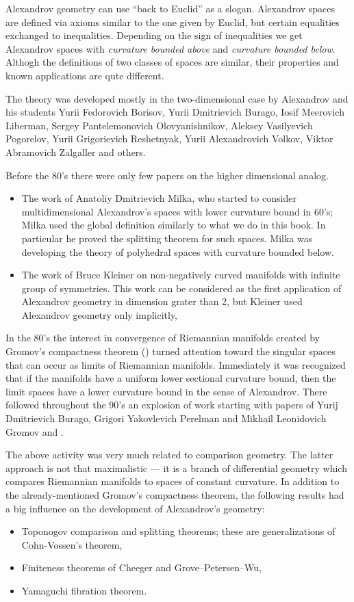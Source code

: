 Alexandrov geometry can use ``back to Euclid'' as a slogan.
Alexandrov spaces are defined via axioms similar to the one given by Euclid,
but certain  equalities exchanged to inequalities. 
Depending on the sign of inequalities we get Alexandrov spaces with \emph{curvature bounded above} and \emph{curvature bounded below}.
Althogh the definitions of two classes of spaces are similar, their properties and known applications are qute different.

The theory was developed mostly in the two-dimensional case 
by Alexandrov
and his students  
Yurii Fedorovich Borisov,
Yurii Dmitrievich Burago,
Iosif Meerovich Liberman,
Sergey Pantelemonovich Olovyanishnikov,
Aleksey Vasilyevich Pogorelov,
Yurii Grigorievich Reshetnyak,
Yurii Alexandrovich Volkov,
Viktor Abramovich Zalgaller and others.

Before the 80's 
there were only few papers on the higher dimensional analog.
\begin{itemize}
\item The work of Anatoliy Dmitrievich Milka, 
who started to consider multidimensional Alexandrov's spaces with lower curvature bound in 60's;
Milka used the global definition similarly to what we do in this book.
In particular he proved the splitting theorem for such spaces.
Milka was developing the theory of polyhedral spaces with curvature bounded below.
\item The work of Bruce Kleiner on non-negatively curved manifolds with infinite group of symmetries.
This work can be considered as the first application of Alexandrov geometry in dimension grater than 2,
but Kleiner used Alexandrov geometry only implicitly, 
\end{itemize}

In the 80's the interest in convergence of Riemannian manifolds created by Gromov's compactness theorem (\cite{gomov-precompactness}) turned attention toward the singular spaces that can occur as limits of Riemannian manifolds. 
Immediately it was recognized that if the manifolds have a uniform lower sectional curvature bound, then the limit spaces have a lower curvature bound in the sense of Alexandrov. 
There followed throughout the 90's an explosion of work starting with papers of Yurij Dmitrievich Burago, Grigori Yakovlevich Perelman and Mikhail Leonidovich Gromov  \cite{BGP} and \cite{perelman:spaces2}.

The above activity was very much related to comparison geometry.
The latter approach is not that maximalistic --- it is a branch of differential geometry which compares Riemannian manifolds  to  spaces of constant curvature.
In addition to the already-mentioned Gromov's compactness theorem,
the following results had a big influence on the development of Alexandrov's geometry:
\begin{itemize}
\item Toponogov comparison and splitting theorems;  
these are generalizations of Cohn-Vossen's theorem,
\item Finiteness theorems of
Cheeger and
Grove--Petersen--Wu,
\item Yamaguchi fibration theorem.
\end{itemize}

